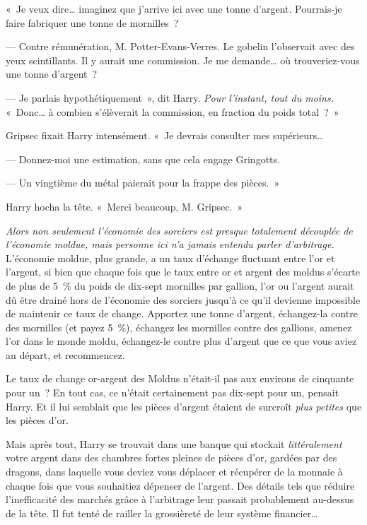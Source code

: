 «~Je veux dire… imaginez que j'arrive ici avec une tonne d'argent. Pourrais-je faire fabriquer une tonne de mornilles~?

--- Contre rémunération, M. Potter-Evans-Verres. Le gobelin l'observait avec des yeux scintillants. Il y aurait une commission. Je me demande… où trouveriez-vous une tonne d'argent~?

--- Je parlais hypothétiquement~», dit Harry. \emph{Pour l'instant, tout du moins.} «~Donc… à combien s'élèverait la commission, en fraction du poids total~?~»

Gripsec fixait Harry intensément. «~Je devrais consulter mes supérieurs…

--- Donnez-moi une estimation, sans que cela engage Gringotts.

--- Un vingtième du métal paierait pour la frappe des pièces.~»

Harry hocha la tête. «~Merci beaucoup, M. Gripsec.~»

\emph{Alors non seulement l'économie des sorciers est presque totalement découplée de l'économie moldue, mais personne ici n'a jamais entendu parler d'arbitrage.} L'économie moldue, plus grande, a un taux d'échange fluctuant entre l'or et l'argent, si bien que chaque fois que le taux entre or et argent des moldus s'écarte de plus de 5~\% du poids de dix-sept mornilles par gallion, l'or ou l'argent aurait dû être drainé hors de l'économie des sorciers jusqu'à ce qu'il devienne impossible de maintenir ce taux de change. Apportez une tonne d'argent, échangez-la contre des mornilles (et payez 5~\%), échangez les mornilles contre des gallions, amenez l'or dans le monde moldu, échangez-le contre plus d'argent que ce que vous aviez au départ, et recommencez.

Le taux de change or-argent des Moldus n'était-il pas aux environs de cinquante pour un~? En tout cas, ce n'était certainement pas dix-sept pour un, pensait Harry. Et il lui semblait que les pièces d'argent étaient de surcroît \emph{plus petites} que les pièces d'or.

Mais après tout, Harry se trouvait dans une banque qui stockait \emph{littéralement} votre argent dans des chambres fortes pleines de pièces d'or, gardées par des dragons, dans laquelle vous deviez vous déplacer et récupérer de la monnaie à chaque fois que vous souhaitiez dépenser de l'argent. Des détails tels que réduire l'inefficacité des marchés grâce à l'arbitrage leur passait probablement au-dessus de la tête. Il fut tenté de railler la grossièreté de leur système financier…


